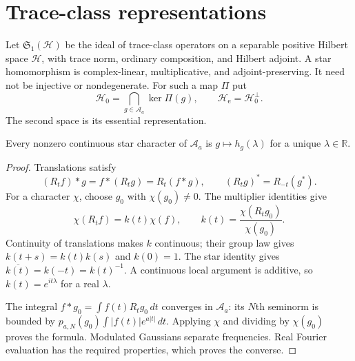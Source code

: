 \section{Trace-class representations}

Let $\mathfrak S_1(\mathcal H)$ be the ideal of trace-class operators
on a separable positive Hilbert space $\mathcal H$, with trace norm,
ordinary composition, and Hilbert adjoint. A star homomorphism is
complex-linear, multiplicative, and adjoint-preserving. It need not
be injective or nondegenerate. For such a map $\Pi$ put
\[
 \mathcal H_0=\bigcap_{g\in\mathcal A_a}\ker\Pi(g),\qquad
 \mathcal H_{\mathrm e}=\mathcal H_0^\perp.
\]
The second space is its essential representation.

\begin{lemma}\label{nwc:lem:characters}
Every nonzero continuous star character of $\mathcal A_a$ is
$g\mapsto h_g(\lambda)$ for a unique $\lambda\in\mathbb R$.
\end{lemma}
\begin{proof}
Translations satisfy
\begin{equation}\label{nwc:eq:multipliers}
 (R_tf)*g=f*(R_tg)=R_t(f*g),\qquad
 (R_tg)^*=R_{-t}(g^*).
\end{equation}
For a character $\chi$, choose $g_0$ with $\chi(g_0)\ne0$.
The multiplier identities give
\[
 \chi(R_tf)=k(t)\chi(f),\qquad
 k(t)=\frac{\chi(R_tg_0)}{\chi(g_0)}.
\]
Continuity of translations makes $k$ continuous; their group law
gives $k(t+s)=k(t)k(s)$ and $k(0)=1$.
The star identity gives $\overline{k(t)}=k(-t)=k(t)^{-1}$.
A continuous local argument is additive, so $k(t)=e^{it\lambda}$
for a real $\lambda$.

The integral $f*g_0=\int f(t)R_tg_0\,dt$ converges in
$\mathcal A_a$: its $N$th seminorm is bounded by
$p_{a,N}(g_0)\int|f(t)|e^{a|t|}\,dt$.
Applying $\chi$ and dividing by $\chi(g_0)$ proves the formula.
Modulated Gaussians separate frequencies. Real Fourier evaluation
has the required properties, which proves the converse.
\end{proof}

